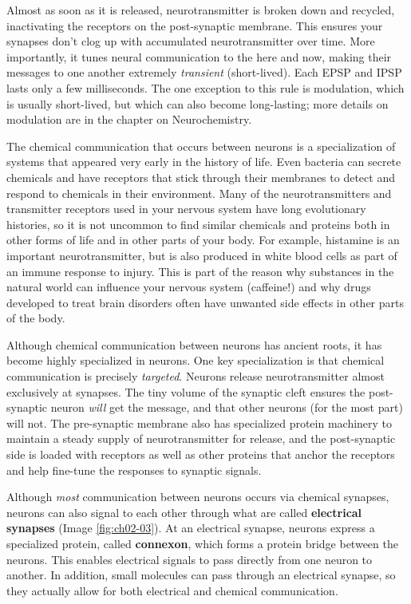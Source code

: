 \documentclass[
]{book}
\begin{document}
Almost as soon as it is released, neurotransmitter is broken down and recycled, inactivating the receptors on the post-synaptic membrane. This ensures your synapses don't clog up with accumulated neurotransmitter over time. More importantly, it tunes neural communication to the here and now, making their messages to one another extremely \emph{transient} (short-lived). Each EPSP and IPSP lasts only a few milliseconds. The one exception to this rule is modulation, which is usually short-lived, but which can also become long-lasting; more details on modulation are in the chapter on Neurochemistry.

The chemical communication that occurs between neurons is a specialization of systems that appeared very early in the history of life. Even bacteria can secrete chemicals and have receptors that stick through their membranes to detect and respond to chemicals in their environment. Many of the neurotransmitters and transmitter receptors used in your nervous system have long evolutionary histories, so it is not uncommon to find similar chemicals and proteins both in other forms of life and in other parts of your body. For example, histamine is an important neurotransmitter, but is also produced in white blood cells as part of an immune response to injury. This is part of the reason why substances in the natural world can influence your nervous system (caffeine!) and why drugs developed to treat brain disorders often have unwanted side effects in other parts of the body.

Although chemical communication between neurons has ancient roots, it has become highly specialized in neurons. One key specialization is that chemical communication is precisely \emph{targeted}. Neurons release neurotransmitter almost exclusively at synapses. The tiny volume of the synaptic cleft ensures the post-synaptic neuron \emph{will} get the message, and that other neurons (for the most part) will not. The pre-synaptic membrane also has specialized protein machinery to maintain a steady supply of neurotransmitter for release, and the post-synaptic side is loaded with receptors as well as other proteins that anchor the receptors and help fine-tune the responses to synaptic signals.

Although \emph{most} communication between neurons occurs via chemical synapses, neurons can also signal to each other through what are called \textbf{electrical synapses} (Image \ref{fig:ch02-03}). At an electrical synapse, neurons express a specialized protein, called \textbf{connexon}, which forms a protein bridge between the neurons. This enables electrical signals to pass directly from one neuron to another. In addition, small molecules can pass through an electrical synapse, so they actually allow for both electrical and chemical communication.
\end{document}

